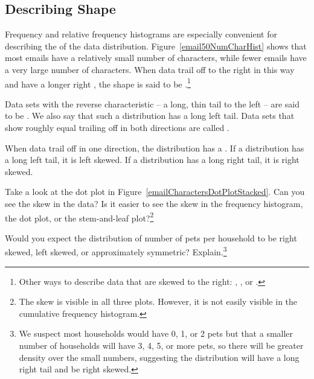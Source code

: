 


\subsection{Describing Shape}
\label{shape}

Frequency and relative frequency histograms are especially convenient for describing the  of the data distribution\label{shapeFirstDiscussed}. Figure~\ref{email50NumCharHist} shows that most emails have a relatively small number of characters, while fewer emails have a very large number of characters. When data trail off to the right in this way and have a longer right , the shape is said to be .\footnote{Other ways to describe data that are skewed to the right: , , or .}

Data sets with the reverse characteristic -- a long, thin tail to the left -- are said to be . We also say that such a distribution has a long left tail. Data sets that show roughly equal trailing off in both directions are called .

\begin{termBox}{
When data trail off in one direction, the distribution has a .  If a distribution has a long left tail, it is left skewed. If a distribution has a long right tail, it is right skewed.}
\end{termBox}

\begin{exercise}
Take a look at the dot plot in Figure~\ref{emailCharactersDotPlotStacked}. Can you see the skew in the data? Is it easier to see the skew in the frequency histogram, the dot plot, or the stem-and-leaf plot?\footnote{The skew is visible in all three plots. However, it is not easily visible in the cumulative frequency histogram.}
\end{exercise}

\begin{exercise}
Would you expect the distribution of number of pets per household to be right skewed, left skewed, or approximately symmetric?  Explain.\footnote{We suspect most households would have 0, 1, or 2 pets but that a smaller number of households will have 3, 4, 5, or more pets, so there will be greater density over the small numbers, suggesting the distribution will have a long right tail and be right skewed.}
\end{exercise}

